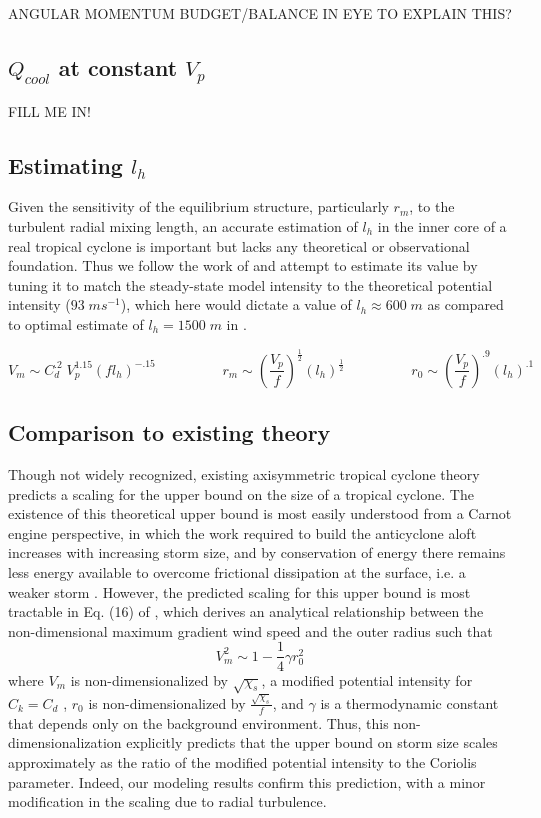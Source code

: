 \documentclass[12pt]{article}
\begin{document}
ANGULAR MOMENTUM BUDGET/BALANCE IN EYE TO EXPLAIN THIS?

\subsection{$Q_{cool}$ at constant $V_p$}
FILL ME IN!

\subsection{Estimating $l_h$}
Given the sensitivity of the equilibrium structure, particularly $r_m$, to the turbulent radial mixing length, an accurate estimation of $l_h$ in the inner core of a real tropical cyclone is important but lacks any theoretical or observational foundation. Thus we follow the work of \cite{Bryan_Rotunno_2009b} and attempt to estimate its value by tuning it to match the steady-state model intensity to the theoretical potential intensity ($93 \; ms^{-1}$), which here would dictate a value of $l_h \approx 600 \; m$ as compared to optimal estimate of $l_h = 1500 \; m$ in \cite{Bryan_Rotunno_2009b}. 

\begin{equation}
\label{eq:scalings}
V_m \sim C_d^{.2} \; V_p^{1.15}\left(fl_h\right)^{-.15} \hspace{2cm} r_m \sim \left(\frac{V_p}{f}\right)^\frac{1}{2}\left(l_h\right)^\frac{1}{2} \hspace{2cm} r_0 \sim \left(\frac{V_p}{f}\right)^{.9}\left(l_h\right)^{.1}
\end{equation}


\subsection{Comparison to existing theory}
Though not widely recognized, existing axisymmetric tropical cyclone theory predicts a scaling for the upper bound on the size of a tropical cyclone. The existence of this theoretical upper bound is most easily understood from a Carnot engine perspective, in which the work required to build the anticyclone aloft increases with increasing storm size, and by conservation of energy there remains less energy available to overcome frictional dissipation at the surface, i.e. a weaker storm \citep{Emanuel_1986}. However, the predicted scaling for this upper bound is most tractable in Eq. (16) of \cite{Emanuel_1995b}, which derives an analytical relationship between the non-dimensional maximum gradient wind speed and the outer radius such that
\begin{equation}
\label{eq:E95}
V_m^2 \sim 1-\frac{1}{4}\gamma r_0^2
\end{equation}
where $V_m$ is non-dimensionalized by $\sqrt{\chi_s}$, a modified potential intensity for $C_k = C_d$ \citep{Bister_Emanuel_1998}, $r_0$ is non-dimensionalized by $\frac{\sqrt{\chi_s}}{f}$, and $\gamma$ is a thermodynamic constant that depends only on the background environment. Thus, this non-dimensionalization explicitly predicts that the upper bound on storm size scales approximately as the ratio of the modified potential intensity to the Coriolis parameter.  Indeed, our modeling results confirm this prediction, with a minor modification in the scaling due to radial turbulence.
\end{document}
